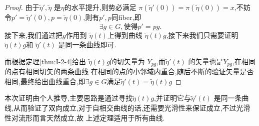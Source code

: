 \documentclass[../main.tex]{subfiles}
\begin{document}
\begin{proof}
   由于$\tilde{\eta}',\tilde{\eta}$ 是$\eta$的水平提升,则势必满足 $\pi(\tilde{\eta}'(0)) = \pi(\tilde{\eta}(0)) = x $,不妨令$p' = \tilde{\eta}'(0), p = \tilde{\eta}(0)$,则有$p',p$同fiber,即 \[
    \exists g \in G, \text{使得}p' = pg
  .\]
  接下来,我们通过把$g$作用到 $\tilde{\eta}(t)$上得到曲线 $\tilde{\eta}(t)g$,接下来我们只需要证明$\tilde{\eta}(t)g$和 $\tilde{\eta}'(t)$ 是同一条曲线即可.

  而根据定理\ref{thm:I-2-4}给出 $\tilde{\eta}(t)g$的切矢量为 $\overline{Y}_{pg}$,而$\tilde{\eta}'(t)$ 的矢量也是$\overline{Y}_{pg}$,在相同的点有相同切矢的两条曲线
  在相同的点的小邻域内重合,随后不断的验证矢量是否相同,最终给出曲线重合,即$\exists g \in G$满足$\tilde{\eta}'(t) = \tilde{\eta}(t)g$
\end{proof}
\begin{note}
 本次证明由个人推导,主要思路是通过寻找$\tilde{\eta}(t)g$,并证明它与$\tilde{\eta}'(t)$ 是同一条曲线,从而验证了双向成立,对于自相交曲线的话,还需要光滑性来保证成立,不过光滑性对流形而言天然成立,故
 上述定理适用于所有曲线.
\end{note}
\end{document}
